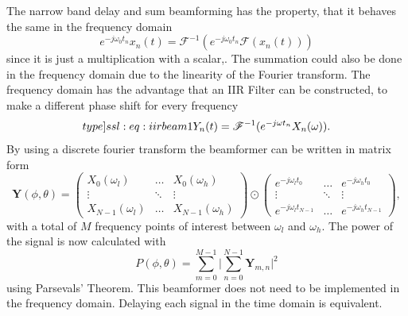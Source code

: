 The narrow band delay and sum beamforming has the property, that it behaves
the same in the frequency domain
\begin{equation}
	e^{-j\omega_0 t_n} x_n(t) = \mathscr{F}^{-1}(e^{-j\omega_0 t_n} \mathscr{F}(x_n(t)))
\end{equation}
since it is just a multiplication with a scalar,.
The summation could also be done in the frequency domain due to the
linearity of the Fourier transform.
The frequency domain has the advantage that an IIR Filter can be constructed, to
make a different phase shift for every frequency
\begin{equation}
	\label[type]{ssl:eq:iirbeam1}
	Y_n(t) = \mathscr{F}^{-1}(e^{-j\omega t_n} X_n(\omega)).
\end{equation}
By using a discrete fourier transform the beamformer can be written
in matrix form
\begin{equation}
	\bm{Y}(\phi, \theta) =
	\begin{pmatrix}
		X_0(\omega_l)     & \hdots & X_0(\omega_h)     \\
		\vdots            & \ddots & \vdots            \\
		X_{N-1}(\omega_l) & \hdots & X_{N-1}(\omega_h)
	\end{pmatrix}
	\odot
	\begin{pmatrix}
		e^{-j\omega_l t_0}     & \hdots & e^{-j\omega_h t_0}     \\
		\vdots                 & \ddots & \vdots                 \\
		e^{-j\omega_l t_{N-1}} & \hdots & e^{-j\omega_h t_{N-1}}
	\end{pmatrix},
\end{equation}
with a total of $M$ frequency points of interest between $\omega_l$ and $\omega_h$.
The power of the signal is now calculated with
\begin{equation}
	P(\phi, \theta) =  \sum_{m=0}^{M-1}\lvert \sum_{n=0}^{N-1} \bm{Y}_{m, n} \rvert^2
\end{equation}
using Parsevals' Theorem.
This beamformer does not need to be implemented in the frequency domain.
Delaying each signal in the time domain is equivalent.

